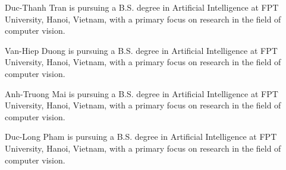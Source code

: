\documentclass{ieeeaccess}
\begin{document}
\begin{IEEEbiography}{Duc-Thanh Tran} is pursuing a B.S. degree in Artificial Intelligence at FPT University, Hanoi, Vietnam, with a primary focus on research in the field of computer vision.
\end{IEEEbiography}

\begin{IEEEbiography}{Van-Hiep Duong} is pursuing a B.S. degree in Artificial Intelligence at FPT University, Hanoi, Vietnam, with a primary focus on research in the field of computer vision.
\end{IEEEbiography}

\begin{IEEEbiography}{Anh-Truong Mai} is pursuing a B.S. degree in Artificial Intelligence at FPT University, Hanoi, Vietnam, with a primary focus on research in the field of computer vision.
\end{IEEEbiography}

\begin{IEEEbiography}{Duc-Long Pham} is pursuing a B.S. degree in Artificial Intelligence at FPT University, Hanoi, Vietnam, with a primary focus on research in the field of computer vision.
\end{IEEEbiography}
\end{document}
